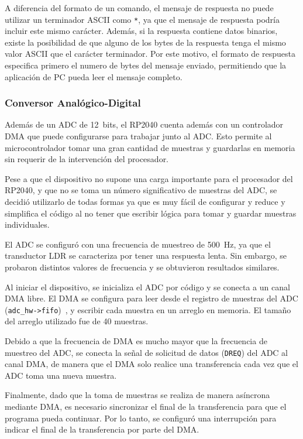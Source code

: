 \documentclass[12pt,a4paper,fleqn]{article}
\begin{document}
A diferencia del formato de un comando, el mensaje de respuesta no puede utilizar un terminador ASCII como \verb|*|, ya que el mensaje de respuesta podría incluir este mismo carácter. Además, si la respuesta contiene datos binarios, existe la posibilidad de que alguno de los bytes de la respuesta tenga el mismo valor ASCII que el carácter terminador. Por este motivo, el formato de respuesta especifica primero el numero de bytes del mensaje enviado, permitiendo que la aplicación de PC pueda leer el mensaje completo.

\subsubsection{Conversor Analógico-Digital}

Además de un ADC de \qty{12}{bits}, el RP2040 cuenta además con un controlador DMA que puede configurarse para trabajar junto al ADC. Esto permite al microcontrolador tomar una gran cantidad de muestras y guardarlas en memoria sin requerir de la intervención del procesador. 

Pese a que el dispositivo no supone una carga importante para el procesador del RP2040, y que no se toma un número significativo de muestras del ADC, se decidió utilizarlo de todas formas ya que es muy fácil de configurar y reduce y simplifica el código al no tener que escribir lógica para tomar y guardar muestras individuales.

El ADC se configuró con una frecuencia de muestreo de \qty{500}{Hz}, ya que el transductor LDR se caracteriza por tener una respuesta lenta. Sin embargo, se probaron distintos valores de frecuencia y se obtuvieron resultados similares. 

Al iniciar el dispositivo, se inicializa el ADC por código y se conecta a un canal DMA libre. El DMA se configura para leer desde el registro de muestras del ADC (\verb|adc_hw->fifo|)~\cite{RP2040_datasheet}, y escribir cada muestra en un arreglo en memoria. El tamaño del arreglo utilizado fue de 40 muestras.

Debido a que la frecuencia de DMA es mucho mayor que la frecuencia de muestreo del ADC, se conecta la señal de solicitud de datos (\verb|DREQ|) del ADC al canal DMA, de manera que el DMA solo realice una transferencia cada vez que el ADC toma una nueva muestra.

Finalmente, dado que la toma de muestras se realiza de manera asíncrona mediante DMA, es necesario sincronizar el final de la transferencia para que el programa pueda continuar. Por lo tanto, se configuró una interrupción para indicar el final de la transferencia por parte del DMA.
\end{document}
